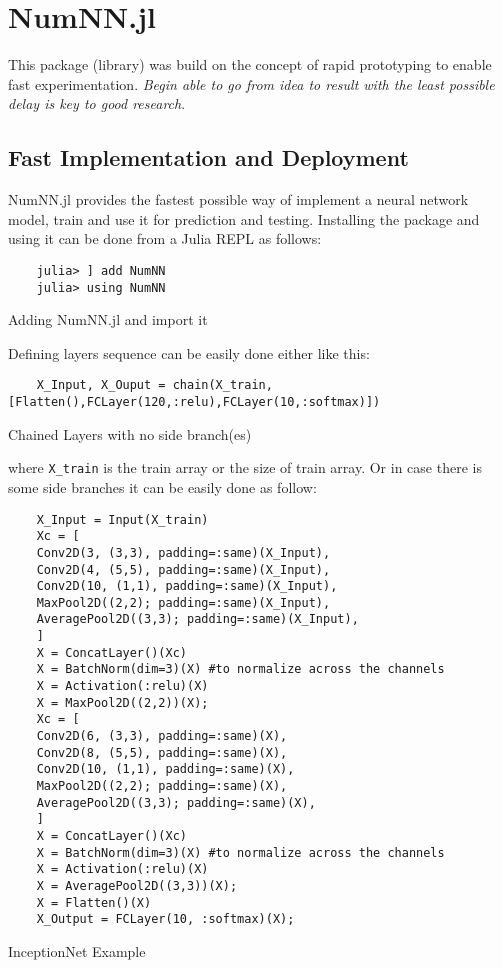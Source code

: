 \section{NumNN.jl}

This package (library) was build on the concept of rapid prototyping to enable fast experimentation. \emph{Begin able to go from idea to result with the least possible delay is key to good research}\cite{Keras}.

\subsection{Fast Implementation and Deployment}

NumNN.jl provides the fastest possible way of implement a neural network model, train and use it for prediction and testing. Installing the package and using it can be done from a Julia REPL as follows:

\begin{listing}[H]
	\begin{verbatim}
	julia> ] add NumNN
	julia> using NumNN
	\end{verbatim}
	\caption{Adding NumNN.jl and import it}\label{addimport}
\end{listing}

Defining layers sequence can be easily done either like this:

\begin{listing}[H]
	\begin{verbatim}
	X_Input, X_Ouput = chain(X_train,[Flatten(),FCLayer(120,:relu),FCLayer(10,:softmax)])
	\end{verbatim}
	\caption{Chained Layers with no side branch(es)}\label{chain}
\end{listing}


where \texttt{X_train} is the train array or the size of train array. Or in case there is some side branches it can be easily done as follow:

\begin{listing}[H]
	\begin{verbatim}
	X_Input = Input(X_train)
	Xc = [
	Conv2D(3, (3,3), padding=:same)(X_Input),
	Conv2D(4, (5,5), padding=:same)(X_Input),
	Conv2D(10, (1,1), padding=:same)(X_Input),
	MaxPool2D((2,2); padding=:same)(X_Input),
	AveragePool2D((3,3); padding=:same)(X_Input),
	]
	X = ConcatLayer()(Xc)
	X = BatchNorm(dim=3)(X) #to normalize across the channels
	X = Activation(:relu)(X)
	X = MaxPool2D((2,2))(X);
	Xc = [
	Conv2D(6, (3,3), padding=:same)(X),
	Conv2D(8, (5,5), padding=:same)(X),
	Conv2D(10, (1,1), padding=:same)(X),
	MaxPool2D((2,2); padding=:same)(X),
	AveragePool2D((3,3); padding=:same)(X),
	]
	X = ConcatLayer()(Xc)
	X = BatchNorm(dim=3)(X) #to normalize across the channels
	X = Activation(:relu)(X)
	X = AveragePool2D((3,3))(X);
	X = Flatten()(X)
	X_Output = FCLayer(10, :softmax)(X);
	\end{verbatim}
	\caption{InceptionNet Example}\label{chain}
\end{listing}

